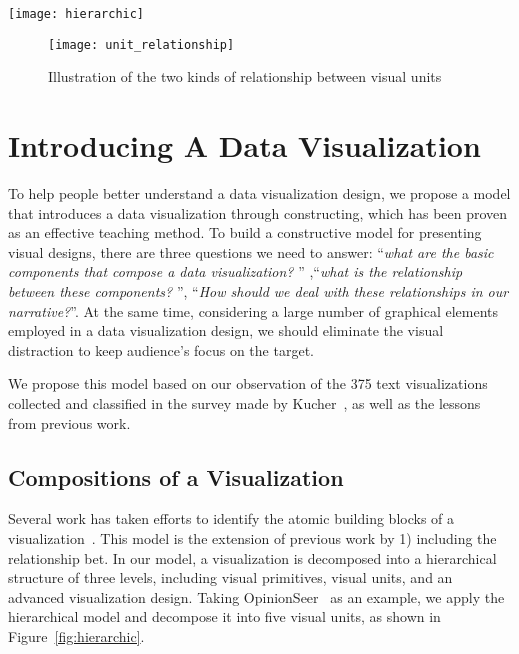 \begin{figure*}
 \centering %
 \texttt{[image: hierarchic]}
 \caption{An example of the hierarchical structure of a visualization, Opinion Seer\cite{wu_opinionseer:_2010}}
 \label{fig:hierarchic}
\end{figure*}

\begin{figure}[tb]
 \centering %
 \texttt{[image: unit\_relationship]}
 \caption{Illustration of the two kinds of relationship between visual units}
 \label{fig:unit_relationship}
\end{figure}

\section{Introducing A Data Visualization} \label{analysis}

To help people better understand a data visualization design, we propose a model that introduces a data visualization through constructing, which has been proven as an effective teaching method\cite{huron_constructive_2014, chapman_constructive_1988}. To build a constructive model for presenting visual designs, there are three questions we need to answer: ``\textit{what are the basic components that compose a data visualization? }'' ,``\textit{what is the relationship between these components? }'', ``\textit{How should we deal with these relationships in our narrative?}''. At the same time, considering a large number of graphical elements employed in a data visualization design, we should eliminate the visual distraction to keep audience's focus on the target.

We propose this model based on our observation of the 375 text visualizations collected and classified in the survey made by Kucher~\cite{kucher2015text}, as well as the lessons from previous work. 

\subsection{Compositions of a Visualization}\label{compositions}
Several work has taken efforts to identify the atomic building blocks of a visualization~\cite{mendez_ivolver:_2016, bertin1983semiology}. 
This model is the extension of previous work by 1) including the relationship bet. 
In our model, a visualization is decomposed into a hierarchical structure of three levels, including
visual primitives, visual units, and an advanced visualization design. 
Taking OpinionSeer~\cite{wu_opinionseer:_2010} as an example, we apply the hierarchical model and decompose it into five visual units, as shown in Figure~\ref{fig:hierarchic}. 


